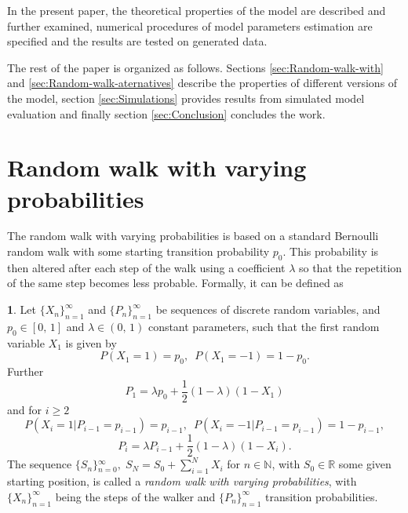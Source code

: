 \documentclass{amsart}
\theoremstyle{definition}
\newtheorem{defn}[thm]{\protect\definitionname}
\theoremstyle{plain}
\theoremstyle{plain}
\theoremstyle{plain}
\numberwithin{equation}{section}
\providecommand{\definitionname}{Definition}
\begin{document}
    In the present paper, the theoretical properties of the model are
    described and further examined, numerical procedures of model
    parameters estimation are specified and the results are tested on
    generated data.

    The rest of the paper is organized as follows. Sections
    \ref{sec:Random-walk-with} and \ref{sec:Random-walk-aternatives}
    describe the properties of different versions of the model,
    section \ref{sec:Simulations} provides results from simulated
    model {\color{red}evaluation} and finally section \ref{sec:Conclusion} concludes
    the work.


    \section{Random walk with varying probabilities\label{sec:Random-walk-with}}

    The random walk with varying probabilities is based on a standard
    Bernoulli random walk \cite{feller1957introduction} with some starting
    transition probability $p_{0}$. This probability is then altered
    after each step of the walk using a coefficient $\lambda$ so that
    the repetition of the same step becomes less probable. Formally, it
    can be defined as
    \begin{defn}
        \label{success_punished}Let ${\{X_{n}\}}_{n=1}^{\infty}$ and ${\{P_{n}\}}_{n=1}^{\infty}$
        be sequences of discrete random variables, and $p_{0}\in[0,\,1]$
        and $\lambda\in(0,\,1)$ constant parameters, such that the first
        random variable $X_{1}$ is given by
        \[
            P(X_{1}=1)=p_{0},\,\,\,
            P(X_{1}=-1)=1-p_{0}.
        \]
        Further
        \begin{equation}
            P_{1}=\lambda p_{0}+\frac{1}{2}(1-\lambda)(1-X_{1})\label{eq:P!1_def}
        \end{equation}
        and for $i\geq2$
        \[
            P(X_{i}=1|P_{i-1}=p_{i-1})=p_{i-1},\,\,\,
            P(X_{i}=-1|P_{i-1}=p_{i-1})=1-p_{i-1},
        \]
        \begin{equation}
            P_{i}=\lambda P_{i-1}+\frac{1}{2}(1-\lambda)(1-X_{i}).\label{eq:Pi_def}
        \end{equation}
        The sequence ${\{S_{n}\}}{}_{n=0}^{\infty},\;S_{N}=S_{0}+\sum_{i=1}^{N}X_{i}$
        for $n\in\mathbb{N}$, with $S_{0}\in\mathbb{R}$ some given starting
        position, is called a \emph{random walk with varying probabilities},
        with ${\{X_{n}\}}_{n=1}^{\infty}$ being the steps of the walker and
        ${\{P_{n}\}}_{n=1}^{\infty}$ transition probabilities.
    \end{defn}
\end{document}
